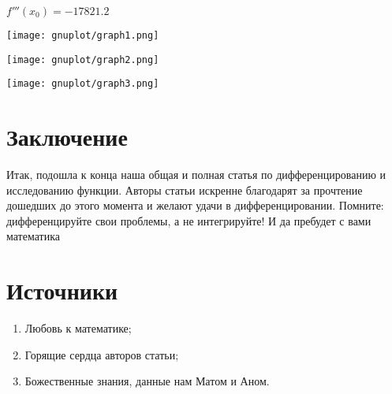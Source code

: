 \documentclass{article}
\begin{document}
$f'''(x_0) = -17821.2$

\texttt{[image: gnuplot/graph1.png]}

\texttt{[image: gnuplot/graph2.png]}

\texttt{[image: gnuplot/graph3.png]}

\section{Заключение}

Итак, подошла к конца наша общая и полная статья по дифференцированию и исследованию функции. Авторы статьи искренне благодарят за прочтение дошедших до этого момента и желают удачи в дифференцировании. Помните: дифференцируйте свои проблемы, а не интегрируйте! И да пребудет с вами математика

\section*{Источники}
\begin{enumerate}
	\item Любовь к математике;
	\item Горящие сердца авторов статьи;
	\item Божественные знания, данные нам Матом и Аном.
\end{enumerate}
\end{document}
